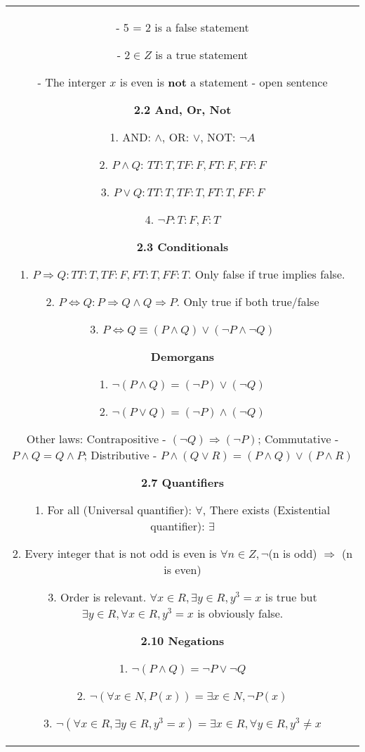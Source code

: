 \documentclass[a4paper]{article}
\begin{document}
\begin{tabular}{@{}c@{}}
\begin{minipage}[t][\paperheight][t]{0.49\paperwidth}
        \quad - 5 = 2 is a false statement

        \quad -  $2 \in Z$ is a true statement

        \quad - The interger $x$ is even is \textbf{not} a statement - open sentence

        \textbf{2.2 And, Or, Not}
        
        1. AND: $\land$, OR: $\lor$, NOT: $\neg A$
        
        2. $P \land Q$:  $TT : T, TF:F, FT:F, FF:F$
        
        3. $P \lor Q: TT:T, TF:T, FT:T, FF:F$ 

        4.  $\neg P: T:F, F:T$

        \textbf{2.3 Conditionals}

        1. $P \Rightarrow Q: TT:T, TF:F, FT:T, FF:T$. Only false if true implies false.


        2. $P \iff Q: P \Rightarrow Q \land Q \Rightarrow P$. Only true if both true/false

        3. $P \iff Q \equiv (P \land Q) \lor(\neg P \land \neg Q)$ 

        \textbf{Demorgans}
        
        1. $\neg (P \land Q) = (\neg P) \lor (\neg Q)$
        
        2. $\neg (P \lor Q) = (\neg P) \land (\neg Q)$

        Other laws: Contrapositive - $(\neg Q) \Rightarrow (\neg P)$; Commutative -  $P \land Q = Q \land P$; Distributive -  $P \land (Q \lor R) = (P \land Q) \lor (P\land R)$

        \textbf{2.7 Quantifiers}

        1. For all (Universal quantifier): $\forall$, There exists (Existential quantifier):  $\exists$

        2. Every integer that is not odd is even is $\forall n \in Z, \neg$(n is odd)  $\Rightarrow$ (n is even)

        3. Order is relevant. $\forall x \in R, \exists y \in R, y^3 = x$ is true but $\exists y \in R, \forall x \in R, y^3 = x $ is obviously false.


        \textbf{2.10 Negations}

        1. $\neg(P \land Q) = \neg P \lor \neg Q$

        2. $\neg(\forall x \in N, P(x)) = \exists x \in N, \neg P(x)$

        3.  $\neg (\forall x \in R, \exists y \in R, y^3 = x) = \exists x \in R, \forall y \in R, y^3 \ne x$




\end{minipage}
\end{tabular}
\end{document}
